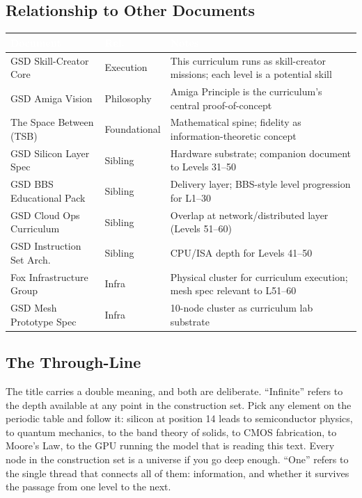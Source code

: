\documentclass[11pt,letterpaper]{article}
\newcommand{\tableheader}[1]{\textbf{\sffamily\textcolor{white}{#1}}}
\begin{document}
\subsection{Relationship to Other Documents}

\begin{center}
\begin{tabularx}{\textwidth}{L{3.8cm}L{2cm}X}
\toprule
{}
\tableheader{Document} & \tableheader{Rel.} & \tableheader{Notes} \\
\midrule
GSD Skill-Creator Core & Execution & This curriculum runs as skill-creator missions; each level is a potential skill \\
GSD Amiga Vision & Philosophy & Amiga Principle is the curriculum's central proof-of-concept \\
The Space Between (TSB) & Foundational & Mathematical spine; fidelity as information-theoretic concept \\
GSD Silicon Layer Spec & Sibling & Hardware substrate; companion document to Levels 31--50 \\
GSD BBS Educational Pack & Sibling & Delivery layer; BBS-style level progression for L1--30 \\
GSD Cloud Ops Curriculum & Sibling & Overlap at network/distributed layer (Levels 51--60) \\
GSD Instruction Set Arch. & Sibling & CPU/ISA depth for Levels 41--50 \\
Fox Infrastructure Group & Infra & Physical cluster for curriculum execution; mesh spec relevant to L51--60 \\
GSD Mesh Prototype Spec & Infra & 10-node cluster as curriculum lab substrate \\
\bottomrule
\end{tabularx}
\end{center}

\subsection{The Through-Line}

The title carries a double meaning, and both are deliberate. ``Infinite'' refers to the depth
available at any point in the construction set. Pick any element on the periodic table and
follow it: silicon at position 14 leads to semiconductor physics, to quantum mechanics, to the
band theory of solids, to CMOS fabrication, to Moore's Law, to the GPU running the model that
is reading this text. Every node in the construction set is a universe if you go deep enough.
``One'' refers to the single thread that connects all of them: information, and whether it
survives the passage from one level to the next.
\end{document}
